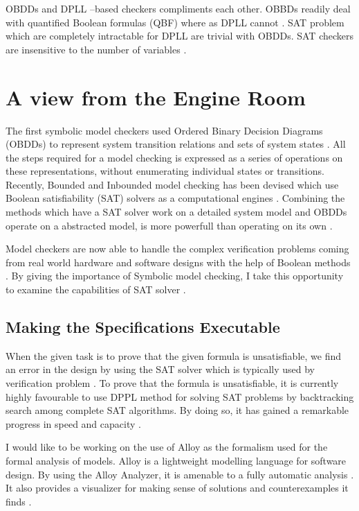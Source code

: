 \documentclass[a4paper,10pt]{report}
\begin{document}
OBDDs and DPLL –based checkers compliments each other. OBBDs readily deal with quantified Boolean formulas (QBF) where as DPLL cannot \cite{Bryant1986}. SAT problem which are completely intractable for DPLL are trivial with OBDDs. SAT checkers are insensitive to the number of variables \cite{Strichman}.

\section{A view from the Engine Room}
\label{View from engine}

The first symbolic model checkers used Ordered Binary Decision Diagrams (OBDDs) \cite{Bryant1986} to represent system transition relations and sets of system states \cite{McMillan1992} . All the steps required for a model checking is expressed as a series of operations on these representations, without enumerating individual states or transitions. Recently, Bounded and Inbounded model checking has been devised which use Boolean satisfiability (SAT) solvers as a computational engines \cite{McMillan1992}. Combining the methods which have a SAT solver work on a detailed system model and OBDDs operate on a abstracted model, is more powerfull than operating on its own \cite{Clarke1999}.

Model checkers are now able to handle the complex verification problems coming from real world hardware and software designs with the help of Boolean methods \cite{ErichGamma1995}. By giving the importance of Symbolic model checking, I take this opportunity to examine the capabilities of SAT solver \cite{Bryant1986}.

\subsection{Making the Specifications Executable}
\label{Spec Exec}

When the given task is to prove that the given formula is unsatisfiable, we find an error in the design by using the SAT solver which is typically used by verification problem \cite{McMillan2003}. To prove that the formula is unsatisfiable, it is currently highly favourable to use DPPL method \cite{M.Davis1962} for solving SAT problems by backtracking search among complete SAT algorithms. By doing so, it has gained a remarkable progress in speed and capacity \cite{M.Moskewicz2001}.

I would like to be working on the use of Alloy as the formalism used for the formal analysis of models. Alloy is a lightweight modelling language for software design. By using the Alloy Analyzer, it is amenable to a fully automatic analysis \cite{D.Jackson}. It also provides a visualizer for making sense of solutions and counterexamples it finds \cite{P.Curson}.
\end{document}
